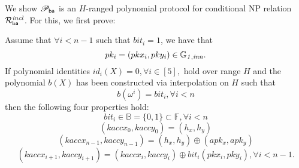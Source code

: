 \noindent We show $\mathscr{P}_{\mathsf{ba}}$ is an $H$-ranged polynomial protocol for conditional NP relation $\mathcal{R}^{\mathit{incl}}_{\mathsf{ba}}$. For this, we first prove:
\vspace{-0.05in}
\begin{test_claim} Assume that $\forall i < n-1$ such that $\mathit{bit}_i = 1$, we have that $$pk_i = (pkx_i, pky_i) \in \mathbb{G}_{\mathit{1,inn}}.$$ 
If polynomial identities $id_i(X) = 0, \forall i \in [5],$ hold over range 
$H$ and the polynomial $b(X)$ has been constructed via interpolation on $H$ such that $$b(\omega^i) = \mathit{bit}_i, \forall i <n$$ then the following four properties hold:
$$\mathit{bit}_i \in \mathbb{B} = \{0,1\} \subset \mathbb{F}, \forall i <n$$ 
$$(kaccx_{0}, kaccy_{0}) = (h_x, h_y)$$ 
$$(kaccx_{n-1}, kaccy_{n-1}) = (h_x, h_y)\oplus (apk_x, apk_y)$$ 
$$(kaccx_{i+1}, kaccy_{i+1}) =  (kaccx_{i}, kaccy_{i}) \oplus \mathit{bit}_i(pkx_{i}, pky_{i}), \forall i < n-1.$$
\label{claim:keys_affine_comm}
\end{test_claim}
\vspace{-0.7cm}
